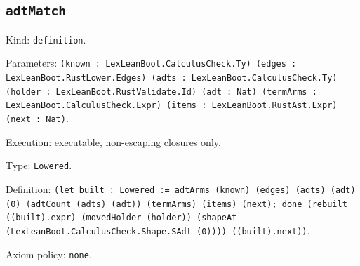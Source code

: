 \documentclass[11pt]{article}
\begin{document}
\subsection*{\texttt{adtMatch}}
\noindent Kind: \texttt{definition}.\par
\noindent Parameters: \texttt{(known : LexLeanBoot.CalculusCheck.Ty) (edges : LexLeanBoot.RustLower.Edges) (adts : LexLeanBoot.CalculusCheck.Ty) (holder : LexLeanBoot.RustValidate.Id) (adt : Nat) (termArms : LexLeanBoot.CalculusCheck.Expr) (items : LexLeanBoot.RustAst.Expr) (next : Nat)}.\par
\noindent Execution: executable, non-escaping closures only.\par
\noindent Type: \texttt{Lowered}.\par
\noindent Definition: \texttt{(let built : Lowered := adtArms (known) (edges) (adts) (adt) (0) (adtCount (adts) (adt)) (termArms) (items) (next); done (rebuilt ((built).expr) (movedHolder (holder)) (shapeAt (LexLeanBoot.CalculusCheck.Shape.SAdt (0)))) ((built).next))}.\par
\noindent Axiom policy: \texttt{none}.\par
\end{document}
